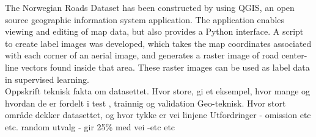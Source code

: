 The Norwegian Roads Dataset has been constructed by using QGIS, an open source geographic information system application. The application enables viewing and editing of map data, but also provides a Python interface. A script to create label images was developed, which takes the map coordinates associated with each corner of an aerial image, and generates a raster image of road center-line vectors found inside that area. These raster images can be used as label data in supervised learning. \\

Oppskrift
teknisk fakta om datasettet. Hvor store, gi et eksempel, hvor mange og hvordan de er fordelt i test , trainnig og validation 
Geo-teknisk. Hvor stort område dekker datasettet, og hvor tykke er vei linjene
Utfordringer - omission etc etc.
random utvalg - gir 25\% med vei -etc etc